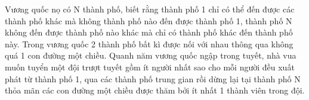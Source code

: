 Vương quốc nọ có N thành phố, biết rằng thành phố 1 chỉ có thể đến được các thành phố khác mà không thành phố nào đến được thành phố 1, thành phố N không đến được thành phố nào khác mà chỉ có thành phố khác đến thành phố này. Trong vương quốc 2 thành phố bất kì được nối với nhau thông qua không quá 1 con đường một chiều. Quanh năm vương quốc ngập trong tuyết, nhà vua muốn tuyển một đội trượt tuyết gồm ít người nhất sao cho mỗi người đều xuất phát từ thành phố 1, qua các thành phố trung gian rồi dừng lại tại thành phố N thỏa mãn các con đường một chiều được thăm bởi ít nhất 1 thành viên trong đội.